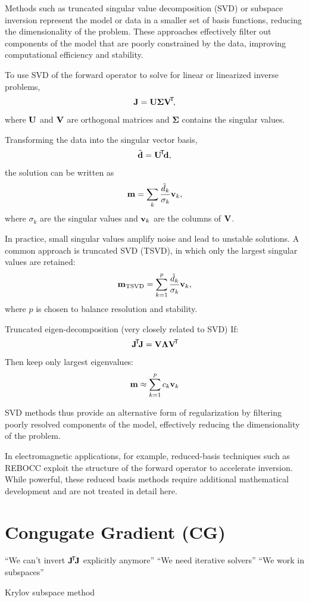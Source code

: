 Methods such as truncated singular value decomposition (SVD) or subspace inversion represent the model or data in a smaller set of basis functions, reducing the dimensionality of the problem. These approaches effectively filter out components of the model that are poorly constrained by the data, improving computational efficiency and stability.

To use SVD of the forward operator to solve for linear or linearized inverse problems,
\[
    \vb{J} = \vb{U} \boldsymbol{\Sigma} \vb{V}\!^\mathsf{T}\!,
\]
where $\vb{U}$ and $\vb{V}$ are orthogonal matrices and $\boldsymbol{\Sigma}$ contains the singular values.

Transforming the data into the singular vector basis,
\[
    \tilde{\vb{d}} = \vb{U}\!^\mathsf{T}\! \vb{d},
\]
the solution can be written as
\[
    \vb{m} = \sum_{k} \frac{\tilde{d}_k}{\sigma_k} \vb{v}_k,
\]
where $\sigma_k$ are the singular values and $\vb{v}_k$ are the columns of $\vb{V}$.

In practice, small singular values amplify noise and lead to unstable solutions. A common approach is truncated SVD (TSVD), in which only the largest singular values are retained:
\[
    \vb{m}_{\text{TSVD}} = \sum_{k=1}^{p} \frac{\tilde{d}_k}{\sigma_k} \vb{v}_k,
\]
where $p$ is chosen to balance resolution and stability.

Truncated eigen-decomposition (very closely related to SVD)
If:
\[
    \vb{J}\!^\mathsf{T}\! \vb{J} = \vb{V} \boldsymbol{\Lambda} \vb{V}\!^\mathsf{T}\!
\]
Then keep only largest eigenvalues:
\[
    \vb{m} \approx \sum_{k=1}^{p} c_k \vb{v}_k
\]

SVD methods thus provide an alternative form of regularization by filtering poorly resolved components of the model, effectively reducing the dimensionality of the problem.

In electromagnetic applications, for example, reduced-basis techniques such as REBOCC exploit the structure of the forward operator to accelerate inversion.  While powerful, these reduced basis methods require additional mathematical development and are not treated in detail here.

\section{Congugate Gradient (CG)}

“We can't invert $\vb{J}\!^\mathsf{T}\! \vb{J}$ explicitly anymore”
“We need iterative solvers”
“We work in subspaces”

Krylov subspace method


